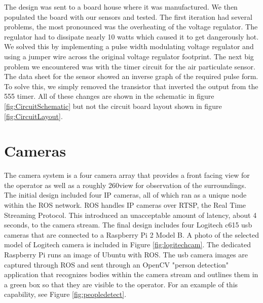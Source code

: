 The design was sent to a board house where it was manufactured. We then populated the board with our sensors and tested. The first iteration had several problems, the most pronounced was the overheating of the voltage regulator. The regulator had to dissipate nearly 10 watts which caused it to get dangerously hot. We solved this by implementing a pulse width modulating voltage regulator and using a jumper wire across the original voltage regulator footprint. The next big problem we encountered was with the timer circuit for the air particulate sensor. The data sheet for the sensor showed an inverse graph of the required pulse form. To solve this, we simply removed the transistor that inverted the output from the 555 timer. All of these changes are shown in the schematic in figure \ref{fig:CircuitSchematic} but not the circuit board layout shown in figure \ref{fig:CircuitLayout}.




\section{Cameras}

The camera system is a four camera array that provides a front facing view for the operator as well as a roughly 260\degree  view for observation of the surroundings. The initial design included four IP cameras, all of which ran as a unique node within the ROS network. ROS handles IP cameras over RTSP, the Real Time Streaming Protocol. This introduced an unacceptable amount of latency, about 4 seconds, to the camera stream. The final design includes four Logitech c615 usb cameras that are connected to a Raspberry Pi 2 Model B. A photo of the selected model of Logitech camera is included in Figure \ref{fig:logitechcam}. The dedicated Raspberry Pi runs an image of Ubuntu with ROS. The usb camera images are captured through ROS and sent through an OpenCV "person detection" application that recognizes bodies within the camera stream and outlines them in a green box so that they are visible to the operator. For an example of this capability, see Figure \ref{fig:peopledetect}. 

